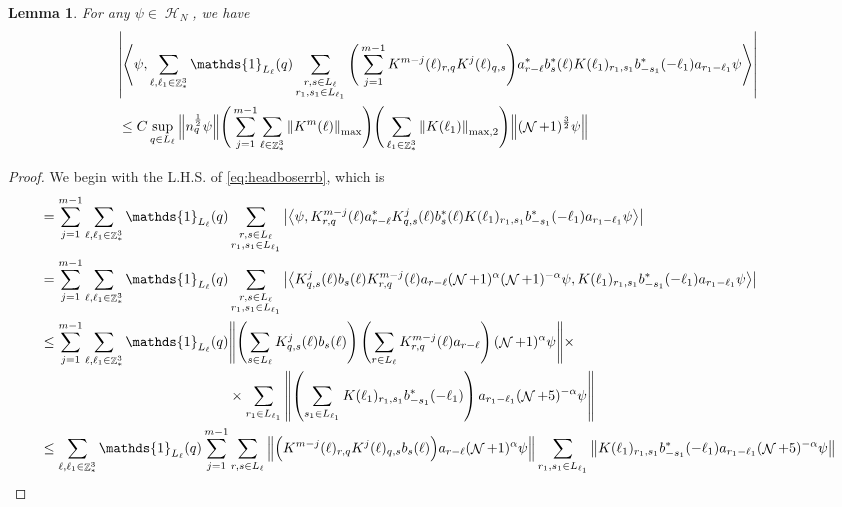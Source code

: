 \documentclass[sn-mathphys, Numbered ,a4paper]{sn-jnl}%
\DeclareMathOperator{\Z}{\mathbb{Z}}
\DeclareMathOperator{\HH}{\mathcal{H}}
\DeclareMathOperator{\NN}{\mathcal{N}}
\newcommand{\half}{\frac{1}{2}}
\newcommand{\eva}[1]{\left\langle #1 \right\rangle}
\theoremstyle{plain}
\newtheorem{lemma}[theorem]{Lemma}
\theoremstyle{definition}
\theoremstyle{remark}
\theoremstyle{plain}
\theoremstyle{definition}
\theoremstyle{remark}
\begin{document}
\begin{lemma}
For any $\psi \in \HH_N$, we have
\begin{align}
     &\abs{\eva{\psi,\sum\limits_{\ell,\ell_1 \in \Z^3_*} \mathds{1}_{L_\ell}(q) \sum\limits_{\substack{r,s \in L_{\ell}\\r_1,s_1\in L_{\ell_1}}}  \Bigg(\sum_{j=1}^{m-1}K^{m-j}(\ell)_{r,q}K^{j}(\ell)_{q,s}\Bigg) a^*_{r-\ell}
     b^*_{s}(\ell)  K(\ell_1)_{r_1,s_1}b^*_{-s_1}(-\ell_1) a_{r_1-\ell_1} \psi }}\nonumber\\
     &\leq C \sup\limits_{q \in L_\ell} \norm{n_{q}^{\half} \psi}\Bigg(\sum_{j=1}^{m-1}\sum\limits_{\ell \in \Z^3_*} \norm{K^m(\ell)}_{\mathrm{max}}\Bigg)\Bigg( \sum\limits_{\ell_1 \in \Z^3_*}\norm{K(\ell_1)}_{\mathrm{max},2} \Bigg) \norm { (\NN+1)^{\frac{3}{2}} \psi }   \label{eq:headboserrb}
\end{align}
\end{lemma}
\begin{proof}
    We begin with the L.H.S. of \eqref{eq:headboserrb}, which is 
    \begin{alignat}{2}
        &= \sum_{j=1}^{m-1}\sum\limits_{\ell,\ell_1 \in \Z^3_*} \mathds{1}_{L_\ell}(q) \sum\limits_{\substack{r,s \in L_{\ell}\\r_1,s_1\in L_{\ell_1}}}  \abs{\eva{\psi, K^{m-j}_{r,q}(\ell)  a^*_{r-\ell} K^{j}_{q,s}(\ell)b^*_{s}(\ell) K(\ell_1)_{r_1,s_1}b^*_{-s_1}(-\ell_1) a_{r_1-\ell_1} \psi }}\nonumber\\
        &= \sum_{j=1}^{m-1}\sum\limits_{\ell,\ell_1 \in \Z^3_*} \mathds{1}_{L_\ell}(q) \sum\limits_{\substack{r,s \in L_{\ell}\\r_1,s_1\in L_{\ell_1}}}  \abs{\eva{ K^{j}_{q,s}(\ell)b_{s}(\ell)  K^{m-j}_{r,q}(\ell)a_{r-\ell}(\NN+1)^{\alpha}(\NN+1)^{-\alpha}\psi,  K(\ell_1)_{r_1,s_1}b^*_{-s_1}(-\ell_1) a_{r_1-\ell_1} \psi }}\nonumber\\
        &\leq \sum_{j=1}^{m-1} \sum\limits_{\ell,\ell_1 \in \Z^3_*} \mathds{1}_{L_\ell}(q) 
        \begin{aligned}[t]
        &  \norm{ \left(\sum\limits_{s \in L_{\ell}}K^{j}_{q,s}(\ell)b_{s}(\ell)\right) \left(\sum\limits_{r \in L_{\ell}}K^{m-j}_{r,q}(\ell)a_{r-\ell}\right)(\NN+1)^{\alpha}\psi}\times\nonumber\\&\times
        \sum\limits_{r_1\in L_{\ell_1}}\norm{ \left(\sum\limits_{s_1\in L_{\ell_1}}K(\ell_1)_{r_1,s_1} b^*_{-s_1}(-\ell_1)\right) a_{r_1-\ell_1} (\NN+5)^{-\alpha} \psi }\nonumber\\    
        \end{aligned}\nonumber\\
        &\leq \sum\limits_{\ell,\ell_1 \in \Z^3_*}  \mathds{1}_{L_\ell}(q) \sum_{j=1}^{m-1} \sum\limits_{r,s \in L_{\ell}}  \norm{  \Big(K^{m-j}(\ell)_{r,q}K^{j}(\ell)_{q,s}b_{s}(\ell)\Big) a_{r-\ell}(\NN+1)^{\alpha}\psi}\sum\limits_{r_1,s_1\in L_{\ell_1}}\norm{
        K(\ell_1)_{r_1,s_1}b^*_{-s_1}(-\ell_1) a_{r_1-\ell_1} (\NN+5)^{-\alpha}\psi }\nonumber\\
    \end{alignat}
\end{proof}
\end{document}
